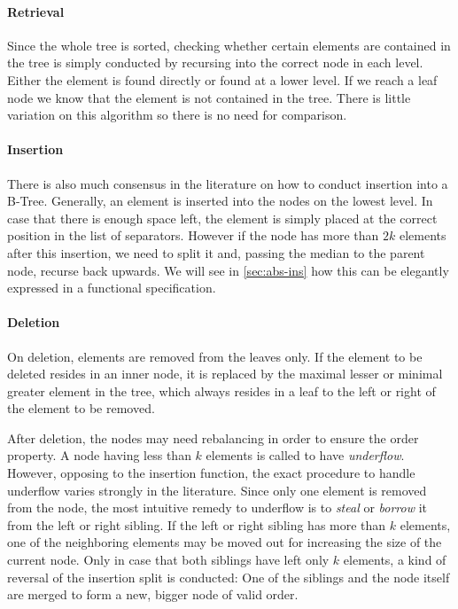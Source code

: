 \paragraph{Retrieval}\label{par:intro-isin}
Since the whole tree is sorted,
checking whether certain elements are contained in the tree
is simply conducted by recursing into the correct node
in each level.
Either the element is found directly or found at a lower level.
If we reach a leaf node we know that the element is not contained in the tree.
There is little variation on this algorithm so there is no need for comparison.

\paragraph{Insertion}\label{par:intro-ins}
There is also much consensus in the literature on how to conduct insertion into a B-Tree.
\parencite{DBLP:journals/csur/Comer79}
Generally, an element is inserted into the nodes on the lowest level.
In case that there is enough space left, the element is simply placed at the correct
position in the list of separators.
However if the node has more than $2k$ elements after this insertion,
we need to split it and, passing the median to the parent node,
recurse back upwards.
We will see in \autoref{sec:abs-ins} how this can be
elegantly expressed in a functional specification.

\paragraph{Deletion}\label{par:intro-del}
On deletion, elements are removed from the leaves only.
If the element to be deleted resides in an inner node,
it is replaced by the maximal lesser or minimal greater
element in the tree, which always resides in a leaf
to the left or right of the element to be removed.

After deletion, the nodes may need rebalancing in order
to ensure the order property.
A node having less than $k$ elements is called to have \textit{underflow}.
However, opposing to the insertion function,
the exact procedure to handle underflow varies strongly in the literature.
Since only one element is removed from the node,
the most intuitive remedy to underflow is to \textit{steal} or \textit{borrow} it
from the left or right sibling.\parencite{DBLP:books/daglib/0023376}
If the left or right sibling has more than $k$ elements,
one of the neighboring elements may be moved out for increasing
the size of the current node.
Only in case that both siblings have left only $k$ elements,
a kind of reversal of the insertion split is conducted:
One of the siblings and the node itself are merged to form
a new, bigger node of valid order.

